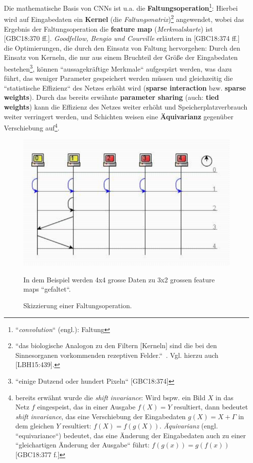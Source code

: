 Die mathematische Basis von CNNs ist u.a. die \textbf{Faltungsoperation}\footnote{
    ``\textit{convolution}`` (engl.): Faltung
}: Hierbei wird auf Eingabedaten ein \textbf{Kernel} (die \textit{Faltungsmatrix})\footnote{
    ``das biologische Analogon zu den Filtern [Kerneln] sind die bei den Sinnesorganen vorkommenden rezeptiven Felder.``~\cite[326]{Ert21b}. Vgl. hierzu auch [LBH15:439].
} angewendet, wobei das Ergebnis der Faltungsoperation die \textbf{feature map} (\textit{Merkmalskarte}) ist [GBC18:370 ff.]. \textit{Goodfellow, Bengio und Courville} erläutern in [GBC18:374 ff.] die Optimierungen, die durch den Einsatz von Faltung hervorgehen: Durch den Einsatz von Kerneln, die nur aus einem Bruchteil der Größe der Eingabedaten bestehen\footnote{ ``einige Dutzend oder hundert Pixeln`` [GBC18:374]
}, können ``aussagekräftige Merkmale`` aufgespürt werden, was dazu führt, das weniger Parameter gespeichert werden müssen und gleichzeitig die ``statistische Effizienz`` des Netzes erhöht wird (\textbf{sparse interaction} bzw. \textbf{sparse weights}). Durch das bereits erwähnte \textbf{parameter sharing} (auch: \textbf{tied weights}) kann die Effizienz des Netzes weiter erhöht und Speicherplatzverbrauch weiter verringert werden, und Schichten weisen eine \textbf{Äquivarianz} gegenüber Verschiebung auf\footnote{ bereits erwähnt wurde die \textit{shift invariance}: Wird bspw. ein Bild $X$ in das Netz $f$ eingespeist, das in einer Ausgabe $f(X) = Y$ resultiert, dann bedeutet \textit{shift invariance}, das eine Verschiebung der Eingabedaten $g(X) = X+\Gamma$ in dem gleichen $Y$ resultiert: $f(X) = f(g(X))$.  \textit{Äquivarianz} (engl. ``equivariance``) bedeutet, das eine Änderung der Eingabedaten auch zu einer ``gleichartigen Änderung der Ausgabe`` führt: $f(g(x)) = g(f(x))$ [GBC18:377 f.]
}.

\begin{figure}[h]
    \centering
    \includegraphics{images/p1ReadSeq.pdf}
    \caption{Skizzierung einer Faltungsoperation.}
    \label{fig-faltung}
    \small
    In dem Beispiel werden 4x4 grosse Daten zu 3x2 grossen feature maps ``gefaltet``.
\end{figure}



